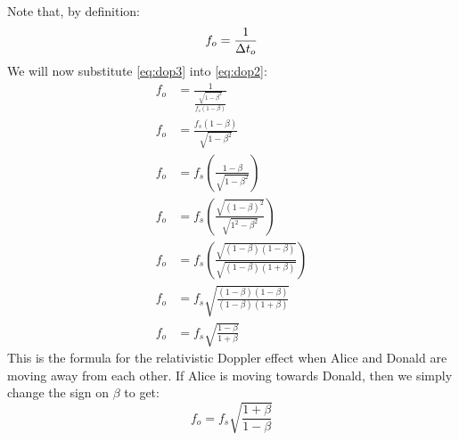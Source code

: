 		Note that, by definition:
		\begin{equation}\label{eq:dop2}
			f_o = \frac{1}{\mathrm{\Delta} t_o}
		\end{equation}
		We will now substitute \eqref{eq:dop3} into \eqref{eq:dop2}:
		\begin{align}
			f_o &= \frac{1}{\frac{\sqrt{1 - \beta^2}}{f_s(1 - \beta)}}\nonumber\\
			f_o &= \frac{f_s(1 - \beta)}{\sqrt{1 - \beta^2}}\nonumber\\
			f_o &= f_s\left(\frac{1 - \beta}{\sqrt{1 - \beta^2}}\right)\nonumber\\
			f_o &= f_s\left(\frac{\sqrt{(1 - \beta)^2}}{\sqrt{1^2 - \beta^2}}\right)\nonumber\\
			f_o &= f_s\left(\frac{\sqrt{(1 - \beta)(1 - \beta)}}{\sqrt{(1 - \beta)(1 + \beta)}}\right)\nonumber\\
			f_o &= f_s\sqrt{\frac{(1 - \beta)(1 - \beta)}{(1 - \beta)(1 + \beta)}}\nonumber\\
			f_o &= f_s \sqrt{\frac{1 - \beta}{1 + \beta}}\label{eq:relDopAway}
		\end{align}
		This is the formula for the relativistic Doppler effect when Alice and Donald are moving away from each other.
		If Alice is moving towards Donald, then we simply change the sign on $\beta$ to get:
		\begin{equation}\label{eq:relDopTowards}
			f_o = f_s \sqrt{\frac{1 + \beta}{1 - \beta}}
		\end{equation}

